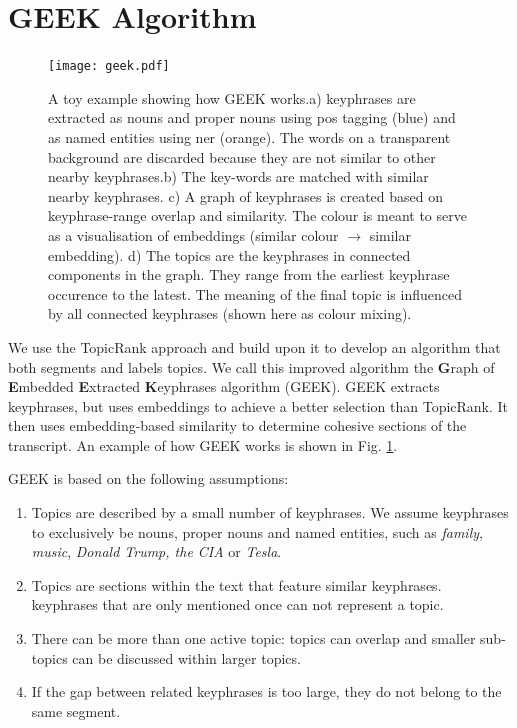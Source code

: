 \section{GEEK Algorithm}

    \begin{figure}
        \centering
        \texttt{[image: geek.pdf]}
        \caption{A toy example showing how GEEK works.\newline a) \Glspl{keyphrase} are extracted as nouns and proper nouns using \gls{pos} tagging (blue) and as named entities using \gls{ner} (orange). The words on a transparent background are discarded because they are not similar to other nearby \glspl{keyphrase}.\newline b) The key-words are matched with similar nearby \glspl{keyphrase}. \newline c) A graph of \glspl{keyphrase} is created based on \gls{keyphrase}-range overlap and similarity. The colour is meant to serve as a visualisation of embeddings (similar colour $\rightarrow$ similar embedding).\newline
        d) The topics are the \glspl{keyphrase} in connected components in the graph. They range from the earliest \gls{keyphrase} occurence to the latest. The meaning of the final topic is influenced by all connected \glspl{keyphrase} (shown here as colour mixing).
        }
        \label{fig:geek architecture}
    \end{figure}

We use the TopicRank approach and build upon it to develop an algorithm that both segments and labels topics. We call this improved algorithm the \textbf{G}raph of \textbf{E}mbedded \textbf{E}xtracted \textbf{K}eyphrases algorithm (GEEK). GEEK extracts \glspl{keyphrase}, but uses \glspl{embedding} to achieve a better selection than TopicRank. It then uses embedding-based similarity to determine cohesive sections of the transcript. An example of how GEEK works is shown in Fig. \ref{fig:geek architecture}.

GEEK is based on the following assumptions:

\begin{enumerate}
    \item Topics are described by a small number of \glspl{keyphrase}. We assume \glspl{keyphrase} to exclusively be nouns, proper nouns and named entities, such as \textit{family}, \textit{music}, \textit{Donald Trump, the CIA} or \textit{Tesla}.
    \item Topics are sections within the text that feature similar \glspl{keyphrase}. \glspl{keyphrase} that are only mentioned once can not represent a topic.
    \item There can be more than one active topic: topics can overlap and smaller sub-topics can be discussed within larger topics.
    \item If the gap between related \glspl{keyphrase} is too large, they do not belong to the same segment.
\end{enumerate}

